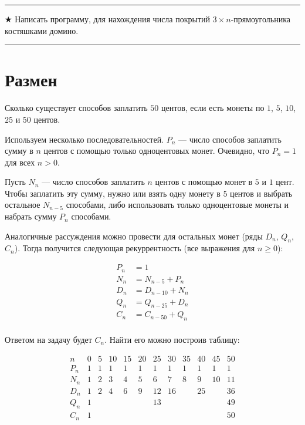 \documentclass[14pt]{book}
\newenvironment{task}
 { \vspace{2ex}\hrule\vspace{2ex}$\bigstar$ }
 { \vspace{2ex}\hrule\vspace{2ex} }
\begin{document}
\begin{task}
Написать программу, для нахождения числа покрытий $3\times n$-прямоугольника костяшками домино.
\end{task}

\section{Размен}

Сколько существует способов заплатить $50$ центов, если есть монеты по $1$, $5$, $10$, $25$ и $50$ центов.

Используем несколько последовательностей. $P_n$ --- число способов заплатить сумму в $n$ центов
с помощью только одноцентовых монет. Очевидно, что $P_n = 1$ для всех $n>0$. 

Пусть $N_n$ --- число способов заплатить $n$ центов с помощью монет в $5$ и $1$ цент.
Чтобы заплатить эту сумму, нужно или взять одну монету в $5$ центов и выбрать остальное
$N_{n-5}$ способами, либо использовать только одноцентовые монеты и набрать сумму $P_n$
способами.

Аналогичные рассуждения можно провести для остальных монет (ряды $D_n$, $Q_n$, $C_n$). 
Тогда получится следующая рекуррентность
(все выражения для $n \ge 0$):

\begin{align*}
P_n &= 1 \\
N_n &= N_{n-5} + P_n \\
D_n &= D_{n-10} + N_n \\
Q_n &= Q_{n-25} + D_n \\
C_n &= C_{n-50} + Q_n \\
\end{align*}

Ответом на задачу будет $C_n$. Найти его можно построив таблицу:

$$
\begin{array}{c|cccccccccccc}
n   & 0 & 5 & 10 & 15 & 20 & 25 & 30 & 35 & 40 & 45 & 50 \\
\hline
P_n & 1 & 1 & 1  & 1  & 1  & 1  & 1  & 1  & 1  & 1  & 1  \\
N_n & 1 & 2 & 3  & 4  & 5  & 6  & 7  & 8  & 9  & 10 & 11 \\
D_n & 1 & 2 & 4  & 6  & 9  & 12 & 16 &    & 25 &    & 36 \\
Q_n & 1 &   &    &    &    & 13 &    &    &    &    & 49 \\
C_n & 1 &   &    &    &    &    &    &    &    &    & 50 \\
\end{array}
$$
\end{document}

